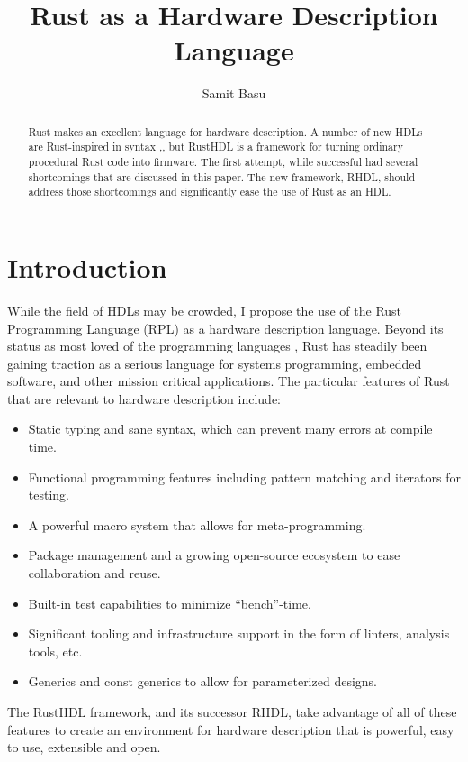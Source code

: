 \documentclass[sigplan,screen,sigconf]{acmart}
\author{Samit Basu}
\affiliation{
  basu.samit@gmail.com
  \country{Fremont CA, USA}
}
\begin{document}
\title{Rust as a Hardware Description Language}

\begin{abstract}
Rust \cite{b9} makes an excellent language for hardware description.  A number of new HDLs are 
Rust-inspired in syntax \cite{b1},\cite{b4},
but RustHDL\cite{b6} is a framework for turning ordinary procedural Rust code into firmware.  The first attempt,
while successful had several shortcomings that are discussed in this paper.  The new framework, RHDL\cite{b10},
should address those shortcomings and significantly ease the use of Rust as an HDL.
\end{abstract}

\maketitle

\section{Introduction}

While the field of HDLs may be crowded, I propose the use of the Rust Programming Language (RPL)
as a hardware description language.  Beyond its status as most loved of the programming languages \cite{b0},
Rust has steadily been gaining traction as a serious language for systems programming, embedded 
software, and other mission critical applications.  The particular features of Rust that are 
relevant to hardware description include:
\begin{itemize}
\item Static typing and sane syntax, which can prevent many errors at compile time.
\item Functional programming features including pattern matching and iterators for testing.
\item A powerful macro system that allows for meta-programming.
\item Package management and a growing open-source ecosystem to ease collaboration and reuse.
\item Built-in test capabilities to minimize ``bench''-time.
\item Significant tooling and infrastructure support in the form of linters, analysis tools, etc.
\item Generics and const generics to allow for parameterized designs.
\end{itemize}

The RustHDL framework, and its successor RHDL, take advantage of all of these features to
create an environment for hardware description that is powerful, easy to use, extensible and open.  
\end{document}
